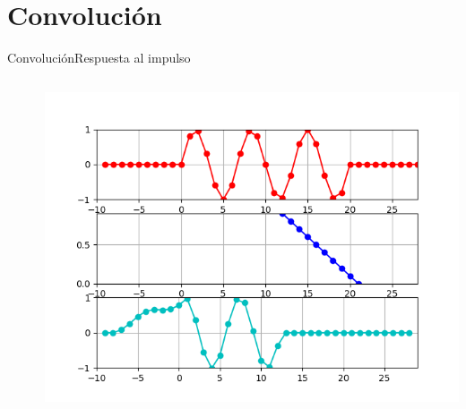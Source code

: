 \section{Convolución}
\begin{frame}{Convolución}{Respuesta al impulso}
   \begin{columns}[c]
      \hspace{5pt}
      \begin{column}{.3\textwidth}
         
      \end{column}
      \hspace{2pt}
      \vrule
      \hspace{2pt}
      \begin{column}{.3\textwidth}
         
      \end{column}
      \hspace{2pt}
      \vrule
      \hspace{2pt}
      \begin{column}{.38\textwidth}
         \centering\includegraphics[width=1.0\textwidth]{4_clase/conv1}
      \end{column}
      \hspace{2pt}
   \end{columns}
   \vfill
\end{frame}
